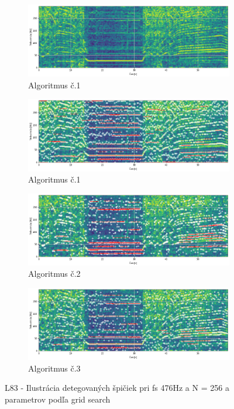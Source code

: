 \begin{figure}[h]
	\centering
	\begin{subfigure}{\textwidth}
        \centering
     	\includegraphics[width=\textwidth]{figures/verification/L83-dataset-spectrum.png}
     	\caption{Algoritmus č.1}
     \end{subfigure}
     \begin{subfigure}{\textwidth}
        \centering
     	\includegraphics[width=\textwidth]{figures/verification/L83-dataset-A1.png}
     	\caption{Algoritmus č.1}
     \end{subfigure}
     \begin{subfigure}{\textwidth}
    	\centering
        \includegraphics[width=\textwidth]{figures/verification/L83-dataset-A2.png}
        \caption{Algoritmus č.2}
     \end{subfigure}
      \begin{subfigure}{\textwidth}
    	\centering
        \includegraphics[width=\textwidth]{figures/verification/L83-dataset-A3.png}
        \caption{Algoritmus č.3}
     \end{subfigure}     
     \caption{L83 - Ilustrácia detegovaných špičiek pri fs 476Hz a N = 256 a parametrov podľa grid search}
\end{figure}


